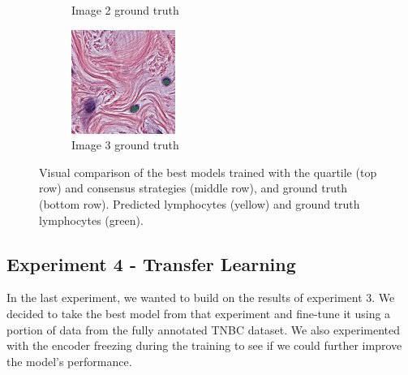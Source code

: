 \begin{figure}[H]
\begin{subfigure}[b]{0.32\textwidth}
    \caption{Image 2 ground truth}
  \end{subfigure}\hfill
  \begin{subfigure}[b]{0.32\textwidth}
    \centering
    \includegraphics[width=\linewidth]{assets/images/for_presentation/exp3-3-gt.png}
    \caption{Image 3 ground truth}
  \end{subfigure}
  \caption{Visual comparison of the best models trained with the quartile (top row) and consensus strategies (middle row), and ground truth (bottom row). Predicted lymphocytes (yellow) and ground truth lymphocytes (green).}
  \label{fig:exp3-results}
\end{figure}


\subsection{Experiment 4 - Transfer Learning}
In the last experiment, we wanted to build on the results of experiment 3. We decided to take the best model from that experiment and fine-tune it using a portion of data from the fully annotated TNBC dataset. We also experimented with the encoder freezing during the training to see if we could further improve the model's performance. 

